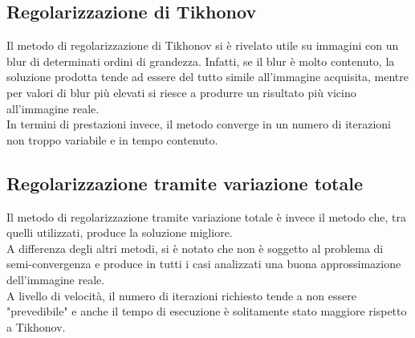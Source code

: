 \documentclass[11pt]{article}
\begin{document}
\subsection{Regolarizzazione di Tikhonov}
Il metodo di regolarizzazione di Tikhonov si è rivelato utile su immagini con un blur di determinati ordini di grandezza. 
Infatti, se il blur è molto contenuto, la soluzione prodotta tende ad essere del tutto simile all'immagine acquisita, mentre per valori di blur più elevati si riesce a produrre un risultato più vicino all'immagine reale.\\
In termini di prestazioni invece, il metodo converge in un numero di iterazioni non troppo variabile e in tempo contenuto.

\subsection{Regolarizzazione tramite variazione totale}
Il metodo di regolarizzazione tramite variazione totale è invece il metodo che, tra quelli utilizzati, produce la soluzione migliore.\\
A differenza degli altri metodi, si è notato che non è soggetto al problema di semi-convergenza e produce in tutti i casi analizzati una buona approssimazione dell'immagine reale.\\
A livello di velocità, il numero di iterazioni richiesto tende a non essere "prevedibile" e anche il tempo di esecuzione è solitamente stato maggiore rispetto a Tikhonov.\\

\newpage
\printbibliography[title={Bibliografia}]
\end{document}
